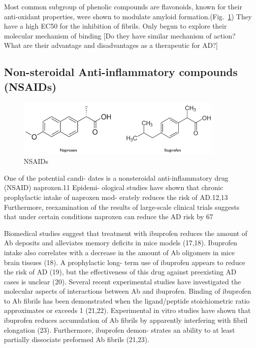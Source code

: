 Most common subgroup of phenolic compounds are flavonoids, known for their anti-oxidant properties, were shown to modulate amyloid formation.(Fig.~\ref{fig:polyphenols})
They have a high EC50 for the inhibition of fibrils.  Only begun to explore their molecular mechanism of binding [Do they have similar mechanism of action? What are their advantage and disadvantages as a therapeutic for AD?]

\subsection{Non-steroidal Anti-inflammatory compounds (NSAIDs)}
\begin{figure}
\centering
\includegraphics[width=4in]{figures/introduction/nsaids.png}
\caption[NSAIDs]{NSAIDs}
\label{fig:polyphenols}
\end{figure}


One of the potential candi- dates is a nonsteroidal anti-inflammatory drug (NSAID) naproxen.11 Epidemi- ological studies have shown that chronic prophylactic intake of naproxen mod- erately reduces the risk of AD.12,13 Furthermore, reexamination of the results of large-scale clinical trials suggests that under certain conditions naproxen can reduce the AD risk by 67%

Biomedical studies suggest that treatment with ibuprofen reduces the amount of Ab deposits and alleviates memory deficits in mice models (17,18). Ibuprofen intake also correlates with a decrease in the amount of Ab oligomers in mice brain tissues (18). A prophylactic long-
term use of ibuprofen appears to reduce the risk of AD (19), but the effectiveness of this drug against preexisting AD cases is unclear (20). Several recent experimental studies have investigated the molecular aspects of interactions between Ab and ibuprofen. Binding of ibuprofen to Ab fibrils has been demonstrated when the ligand/peptide stoichiometric ratio approximates or exceeds 1 (21,22). Experimental in vitro studies have shown that ibuprofen reduces accumulation of Ab fibrils by apparently interfering with fibril elongation (23). Furthermore, ibuprofen demon- strates an ability to at least partially dissociate preformed Ab fibrils (21,23).

